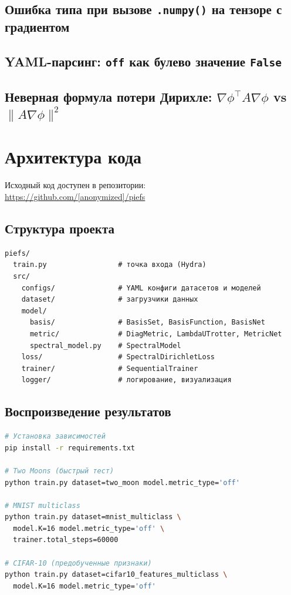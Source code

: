 \documentclass[14pt, a4paper, oneside]{extreport}
\theoremstyle{plain}
\theoremstyle{definition}
\begin{document}
\section{Ошибка типа при вызове \texttt{.numpy()} на тензоре с градиентом}

\section{YAML-парсинг: \texttt{off} как булево значение \texttt{False}}

\section{Неверная формула потери Дирихле: $\nabla\phi^\top A \nabla\phi$ vs $\|A\nabla\phi\|^2$}

\chapter{Архитектура кода}
\label{app:code}

Исходный код доступен в репозитории:\\ \url{https://github.com/[anonymized]/piefs}

\section{Структура проекта}

\begin{lstlisting}
piefs/
  train.py                 # точка входа (Hydra)
  src/
    configs/               # YAML конфиги датасетов и моделей
    dataset/               # загрузчики данных
    model/
      basis/               # BasisSet, BasisFunction, BasisNet
      metric/              # DiagMetric, LambdaUTrotter, MetricNet
      spectral_model.py    # SpectralModel
    loss/                  # SpectralDirichletLoss
    trainer/               # SequentialTrainer
    logger/                # логирование, визуализация
\end{lstlisting}

\section{Воспроизведение результатов}

\begin{lstlisting}[language=bash]
# Установка зависимостей
pip install -r requirements.txt

# Two Moons (быстрый тест)
python train.py dataset=two_moon model.metric_type='off'

# MNIST multiclass
python train.py dataset=mnist_multiclass \
  model.K=16 model.metric_type='off' \
  trainer.total_steps=60000

# CIFAR-10 (предобученные признаки)
python train.py dataset=cifar10_features_multiclass \
  model.K=16 model.metric_type='off'
\end{lstlisting}
\end{document}
